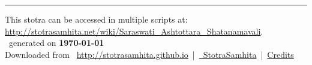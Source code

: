 \documentclass[a5paper,twoside,12pt]{book}
\begin{document}
\setmainfont[Script=Devanagari,Mapping=tex-text]{Sanskrit 2003}
\fontsize {16}{19.25}\selectfont
\let\head\chapt
\begin{center}

\end{center}
\vfill
\centering
\rule{0.8\textwidth}{0.6pt}

\footnotesize
{}\sffamily
This stotra can be accessed in multiple scripts at:\\
\url{http://stotrasamhita.net/wiki/Saraswati_Ashtottara_Shatanamavali}.\\[1ex]
\faFilePdfO~generated on \textbf{\today}\\[1ex]
Downloaded from \faGlobe{}~\url{http://stotrasamhita.github.io}~|~\href{https://github.com/StotraSamhita}{\faGithubSquare{}~StotraSamhita}~|~\href{https://stotrasamhita.github.io/about/}{Credits}
\end{document}
